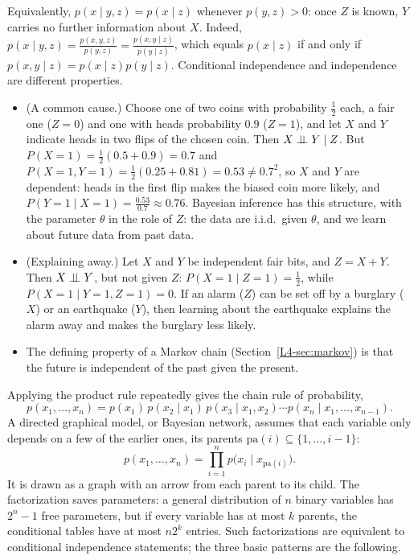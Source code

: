 Equivalently, $p(x \mid y, z) = p(x \mid z)$ whenever $p(y, z) > 0$: once $Z$ is known, $Y$ carries no further information about $X$. Indeed, $p(x \mid y, z) = \frac{p(x, y, z)}{p(y, z)} = \frac{p(x, y \mid z)}{p(y \mid z)}$, which equals $p(x \mid z)$ if and only if $p(x, y \mid z) = p(x \mid z)p(y \mid z)$. Conditional independence and independence are different properties.
\begin{itemize}
    \item (A common cause.) Choose one of two coins with probability $\frac{1}{2}$ each, a fair one ($Z = 0$) and one with heads probability $0.9$ ($Z = 1$), and let $X$ and $Y$ indicate heads in two flips of the chosen coin. Then $X \perp\!\!\!\perp Y \mid Z$. But $P(X = 1) = \frac{1}{2}(0.5 + 0.9) = 0.7$ and $P(X = 1, Y = 1) = \frac{1}{2}(0.25 + 0.81) = 0.53 \neq 0.7^2$, so $X$ and $Y$ are dependent: heads in the first flip makes the biased coin more likely, and $P(Y = 1 \mid X = 1) = \frac{0.53}{0.7} \approx 0.76$. Bayesian inference has this structure, with the parameter $\theta$ in the role of $Z$: the data are i.i.d.\ given $\theta$, and we learn about future data from past data.
    \item (Explaining away.) Let $X$ and $Y$ be independent fair bits, and $Z = X + Y$. Then $X \perp\!\!\!\perp Y$, but not given $Z$: $P(X = 1 \mid Z = 1) = \frac{1}{2}$, while $P(X = 1 \mid Y = 1, Z = 1) = 0$. If an alarm ($Z$) can be set off by a burglary ($X$) or an earthquake ($Y$), then learning about the earthquake explains the alarm away and makes the burglary less likely.
    \item The defining property of a Markov chain (Section~\ref{L4-sec:markov}) is that the future is independent of the past given the present.
\end{itemize}

Applying the product rule repeatedly gives the chain rule of probability,
\[p(x_1, \ldots, x_n) = p(x_1)\,p(x_2 \mid x_1)\,p(x_3 \mid x_1, x_2) \cdots p(x_n \mid x_1, \ldots, x_{n-1}).\]
A directed graphical model, or Bayesian network, assumes that each variable only depends on a few of the earlier ones, its parents $\mathrm{pa}(i) \subseteq \{1, \ldots, i - 1\}$:
\[p(x_1, \ldots, x_n) = \prod_{i=1}^n p\big(x_i \mid x_{\mathrm{pa}(i)}\big).\]
It is drawn as a graph with an arrow from each parent to its child. The factorization saves parameters: a general distribution of $n$ binary variables has $2^n - 1$ free parameters, but if every variable has at most $k$ parents, the conditional tables have at most $n2^k$ entries. Such factorizations are equivalent to conditional independence statements; the three basic patterns are the following.

